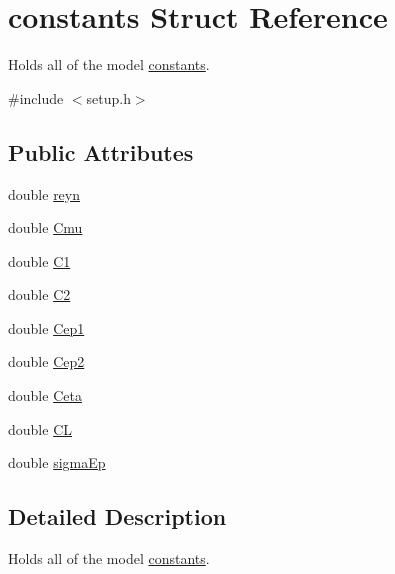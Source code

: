 \hypertarget{structconstants}{
\section{constants Struct Reference}
\label{structconstants}
}


Holds all of the model \hyperlink{structconstants}{constants}.  


{\ttfamily \#include $<$setup.h$>$}\subsection*{Public Attributes}
\begin{DoxyCompactItemize}
\item 
double \hyperlink{structconstants_a68738fe4ec421ad4e0be4ed19501f15a}{reyn}
\item 
double \hyperlink{structconstants_a382f58fd997f76cf1ca691938ad5866e}{Cmu}
\item 
double \hyperlink{structconstants_ad28e357065ee396d1ea2294f866e9c5b}{C1}
\item 
double \hyperlink{structconstants_a3f85ef7fcf04220babce769a49e0b927}{C2}
\item 
double \hyperlink{structconstants_a60f29932f9847bce524357661aa5387f}{Cep1}
\item 
double \hyperlink{structconstants_a28b0b323e3b3173072a5eaf2f89c8a1d}{Cep2}
\item 
double \hyperlink{structconstants_ae8cf7b40da68d2ee9f12f6c0c6cc49cc}{Ceta}
\item 
double \hyperlink{structconstants_a34749e68de59046dca2df37cc428d07c}{CL}
\item 
double \hyperlink{structconstants_ab3ea508d07fee667fcd4dd2331d73634}{sigmaEp}
\end{DoxyCompactItemize}


\subsection{Detailed Description}
Holds all of the model \hyperlink{structconstants}{constants}. 

